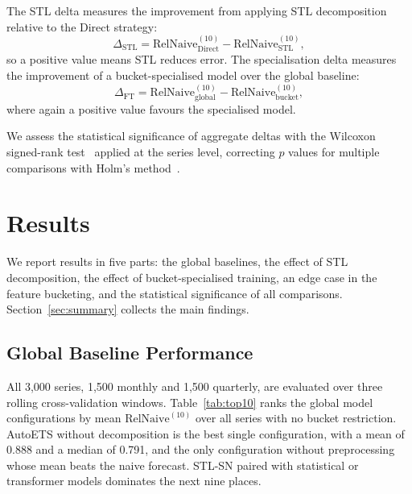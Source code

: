 \documentclass[pdflatex,sn-mathphys-num]{sn-jnl}
\theoremstyle{thmstyleone}
\theoremstyle{thmstyletwo}
\theoremstyle{thmstylethree}
\begin{document}
The STL delta measures the improvement from applying STL decomposition
relative to the Direct strategy:
\begin{equation}
  \Delta_{\mathrm{STL}} =
    \mathrm{RelNaive}^{(10)}_{\mathrm{Direct}} -
    \mathrm{RelNaive}^{(10)}_{\mathrm{STL}},
  \label{eq:stl_delta}
\end{equation}
so a positive value means STL reduces error. The specialisation delta measures
the improvement of a bucket-specialised model over the global baseline:
\begin{equation}
  \Delta_{\mathrm{FT}} =
    \mathrm{RelNaive}^{(10)}_{\mathrm{global}} -
    \mathrm{RelNaive}^{(10)}_{\mathrm{bucket}},
  \label{eq:ft_delta}
\end{equation}
where again a positive value favours the specialised model.

We assess the statistical significance of aggregate deltas with the Wilcoxon
signed-rank test~\cite{wilcoxon1945} applied at the series level, correcting
$p$ values for multiple comparisons with Holm's method~\cite{holm1979}.

\section{Results}\label{sec:results}

We report results in five parts: the global baselines, the effect of STL
decomposition, the effect of bucket-specialised training, an edge case in the
feature bucketing, and the statistical significance of all comparisons.
Section~\ref{sec:summary} collects the main findings.

\subsection{Global Baseline Performance}\label{sec:baseline}

All 3{,}000 series, 1{,}500 monthly and 1{,}500 quarterly, are evaluated over
three rolling cross-validation windows. Table~\ref{tab:top10} ranks the global
model configurations by mean $\mathrm{RelNaive}^{(10)}$ over all series with
no bucket restriction. AutoETS without decomposition is the best single
configuration, with a mean of 0.888 and a median of 0.791, and the only
configuration without preprocessing whose mean beats the naive forecast.
STL-SN paired with statistical or transformer models dominates the next nine
places.
\end{document}
